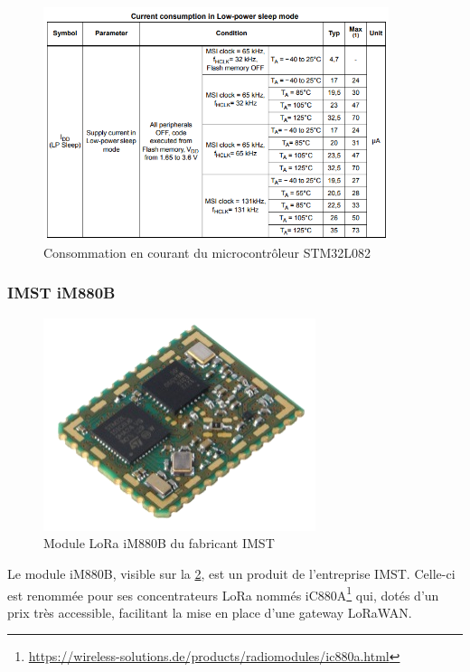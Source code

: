 \begin{figure}[ht!]
    \centering
    \includegraphics[width=0.9\textwidth]{Figures/Hardware/stm32L0_current_consumption.PNG}
    \caption{Consommation en courant du microcontrôleur STM32L082}
    \label{fig-stm32L0_current_consumption}
\end{figure}


\FloatBarrier
\subsubsection{IMST iM880B}

\begin{figure}[ht!]
    \centering
    \includegraphics[width=0.7\textwidth/2]{Figures/Hardware/im880b-l_lora_module.png}
    \caption{Module LoRa iM880B du fabricant IMST}
    \label{fig-im880b-l_lora_module}
\end{figure}

Le module iM880B, visible sur la \cref{fig-im880b-l_lora_module}, est un produit de l'entreprise IMST. Celle-ci est renommée pour ses concentrateurs LoRa nommés iC880A\footnote{\url{https://wireless-solutions.de/products/radiomodules/ic880a.html}} qui, dotés d'un prix très accessible, facilitant la mise en place d'une gateway LoRaWAN. \\


